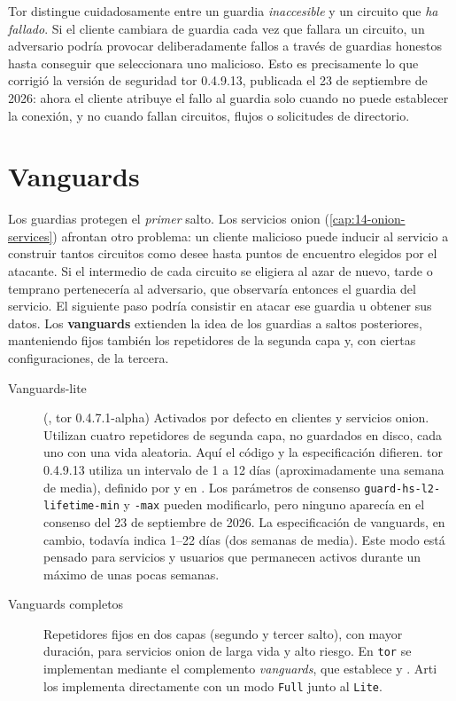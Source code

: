 \begin{attenzione}
Tor distingue cuidadosamente entre un guardia \emph{inaccesible} y un circuito que \emph{ha fallado}. Si el cliente cambiara de guardia cada vez que fallara un circuito, un adversario podría provocar deliberadamente fallos a través de guardias honestos hasta conseguir que seleccionara uno malicioso. Esto es precisamente lo que corrigió la versión de seguridad tor 0.4.9.13, publicada el 23 de septiembre de 2026: ahora el cliente atribuye el fallo al guardia solo cuando no puede establecer la conexión, y no cuando fallan circuitos, flujos o solicitudes de directorio.
\end{attenzione}

\section{Vanguards}\label{sec:vanguards}

Los guardias protegen el \emph{primer} salto. Los servicios onion (\cref{cap:14-onion-services}) afrontan otro problema: un cliente malicioso puede inducir al servicio a construir tantos circuitos como desee hasta puntos de encuentro elegidos por el atacante. Si el intermedio de cada circuito se eligiera al azar de nuevo, tarde o temprano pertenecería al adversario, que observaría entonces el guardia del servicio. El siguiente paso podría consistir en atacar ese guardia u obtener sus datos. Los \textbf{vanguards} extienden la idea de los guardias a saltos posteriores, manteniendo fijos también los repetidores de la segunda capa y, con ciertas configuraciones, de la tercera.

\begin{description}
  \item[Vanguards-lite] (, tor 0.4.7.1-alpha) Activados por defecto en clientes y servicios onion. Utilizan cuatro repetidores de segunda capa, no guardados en disco, cada uno con una vida aleatoria. Aquí el código y la especificación difieren. tor 0.4.9.13 utiliza un intervalo de 1 a 12 días (aproximadamente una semana de media), definido por  y  en . Los parámetros de consenso \texttt{guard-hs-l2-lifetime-min} y \texttt{-max} pueden modificarlo, pero ninguno aparecía en el consenso del 23 de septiembre de 2026. La especificación de vanguards, en cambio, todavía indica 1--22 días (dos semanas de media). Este modo está pensado para servicios y usuarios que permanecen activos durante un máximo de unas pocas semanas.
  \item[Vanguards completos] Repetidores fijos en dos capas (segundo y tercer salto), con mayor duración, para servicios onion de larga vida y alto riesgo. En \texttt{tor} se implementan mediante el complemento \emph{vanguards}, que establece  y . Arti los implementa directamente con un modo \texttt{Full} junto al \texttt{Lite}.
\end{description}

